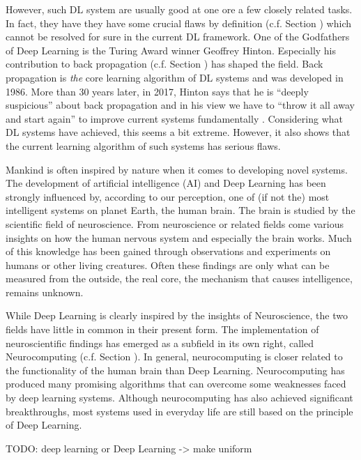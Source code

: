 However, such DL system are usually good at one ore a few closely related tasks.
In fact, they have they have some crucial flaws by definition (c.f. Section ) which cannot be resolved for sure in the current DL framework.
One of the Godfathers of Deep Learning is the Turing Award winner Geoffrey Hinton. 
Especially his contribution to back propagation (c.f. Section ) has shaped the field.
Back propagation is \emph{the} core learning algorithm of DL systems and was developed in 1986.
More than 30 years later, in 2017, Hinton says that he is ``deeply suspicious'' about back propagation and in his view we have to ``throw it all away and start again'' to improve current systems fundamentally .
Considering what DL systems have achieved, this seems a bit extreme.
However, it also shows that the current learning algorithm of such systems has serious flaws.

Mankind is often inspired by nature when it comes to developing novel systems.
The development of artificial intelligence (AI) and Deep Learning has been strongly influenced by, according to our perception, one of (if not the) most intelligent systems on planet Earth, the human brain.
The brain is studied by the scientific field of neuroscience.
From neuroscience or related fields come various insights on how the human nervous system and especially the brain works.
Much of this knowledge has been gained through observations and experiments on humans or other living creatures.
Often these findings are only what can be measured from the outside, the real core, the mechanism that causes intelligence, remains unknown.

While Deep Learning is clearly inspired by the insights of Neuroscience, the two fields have little in common in their present form.
The implementation of neuroscientific findings has emerged as a subfield in its own right, called Neurocomputing (c.f. Section ).
In general, neurocomputing is closer related to the functionality of the human brain than Deep Learning.
Neurocomputing has produced many promising algorithms that can overcome some weaknesses faced by deep learning systems. 
Although neurocomputing has also achieved significant breakthroughs, most systems used in everyday life are still based on the principle of Deep Learning.

TODO: deep learning or Deep Learning -> make uniform

